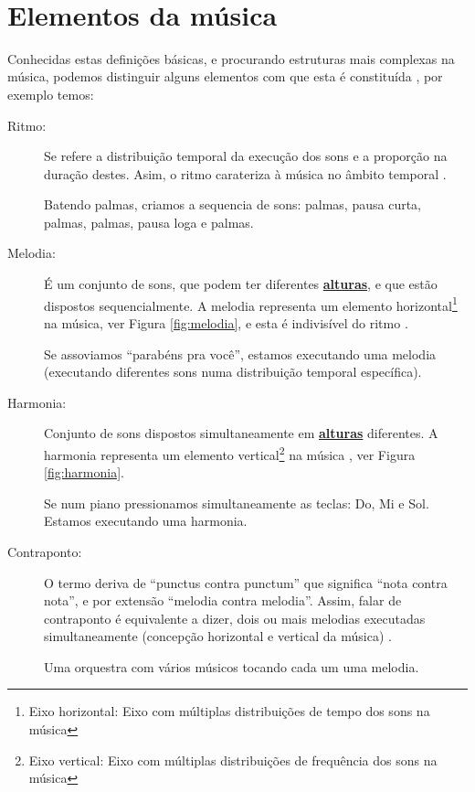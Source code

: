 ~\\

\section{Elementos da música}
Conhecidas estas definições básicas, e procurando estruturas mais complexas na música,
podemos distinguir alguns elementos com que esta é constituída \cite[pp. 11]{alves2004teoria}, 
por exemplo temos:

\begin{description}
\item [Ritmo:] \label{sec:pos:Ritmo}
Se refere a distribuição temporal da execução dos sons e a proporção na duração destes. 
Asim, o ritmo carateriza à música no âmbito temporal \cite[pp. 11]{medteoria}.
\begin{example}
Batendo palmas, criamos a sequencia de sons: palmas, pausa curta, palmas, palmas, pausa loga e palmas.
\end{example} 
\item [Melodia:] \label{sec:pos:Melodia}
É um conjunto de sons, que podem ter diferentes \hyperref[sec:pos:Altura]{\textbf{alturas}}, 
e que estão dispostos sequencialmente. 
A melodia representa um elemento horizontal\footnote{\label{eixohor}Eixo horizontal: Eixo com múltiplas distribuições de tempo dos sons na música} na música, ver Figura \ref{fig:melodia},
e esta é indivisível do ritmo \cite[pp. 517]{apel1969harvard} \cite[pp. 11]{medteoria}.
\begin{example}
Se assoviamos ``parabéns pra você'', estamos executando uma melodia 
(executando diferentes sons numa distribuição temporal específica).
\end{example} 
\item [Harmonia:] \label{sec:pos:Harmonia}
Conjunto de sons dispostos simultaneamente em \hyperref[sec:pos:Altura]{\textbf{alturas}} diferentes.
A harmonia representa um elemento vertical\footnote{\label{eixover}Eixo vertical: Eixo com múltiplas distribuições de frequência dos sons na música} na música \cite[pp. 371]{apel1969harvard} \cite[pp. 8]{cardoso1973curso} \cite[pp. 11]{medteoria}, 
ver Figura \ref{fig:harmonia}. 
\begin{example}
Se num piano pressionamos simultaneamente as teclas: Do, Mi e Sol. Estamos executando uma harmonia.
\end{example} 
\item [Contraponto:] \label{sec:pos:Contraponto}
O termo deriva de ``punctus contra punctum'' que significa ``nota contra nota'', 
e por extensão ``melodia contra melodia''. 
Assim, falar de contraponto é equivalente a dizer, dois ou mais melodias executadas simultaneamente  
(concepção horizontal e vertical da música)  \cite[pp. 208]{apel1969harvard} \cite[pp. 11]{medteoria}.
\begin{example}
Uma orquestra com vários músicos tocando cada um uma melodia.
\end{example} 
\end{description}


